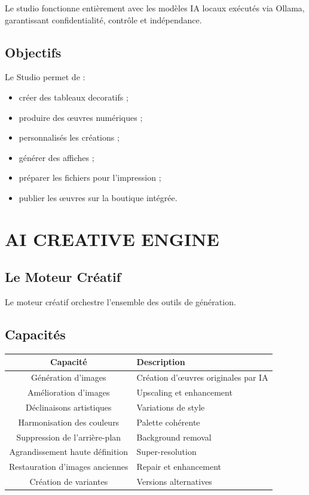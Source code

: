 \documentclass[12pt,a4paper,oneside]{book}
\begin{document}
Le studio fonctionne entièrement avec les modèles IA locaux exécutés via Ollama, garantissant confidentialité, contrôle et indépendance.

\section{Objectifs}
Le Studio permet de :
\begin{itemize}
\item créer des tableaux decoratifs ;
\item produire des œuvres numériques ;
\item personnalisés les créations ;
\item générer des affiches ;
\item préparer les fichiers pour l'impression ;
\item publier les œuvres sur la boutique intégrée.
\end{itemize}

\chapter{AI CREATIVE ENGINE}

\section{Le Moteur Créatif}
Le moteur créatif orchestre l'ensemble des outils de génération.

\section{Capacités}
\begin{center}
\begin{tabular}{|c|p{10cm}|}
\hline
\rowcolor{electronblue}
\color{white}\textbf{Capacité} & \color{white}\textbf{Description} \\
\hline
Génération d'images & Création d'œuvres originales par IA \\
\hline
Amélioration d'images & Upscaling et enhancement \\
\hline
Déclinaisons artistiques & Variations de style \\
\hline
Harmonisation des couleurs & Palette cohérente \\
\hline
Suppression de l'arrière-plan & Background removal \\
\hline
Agrandissement haute définition & Super-resolution \\
\hline
Restauration d'images anciennes & Repair et enhancement \\
\hline
Création de variantes & Versions alternatives \\
\hline
\end{tabular}
\end{center}
\end{document}
